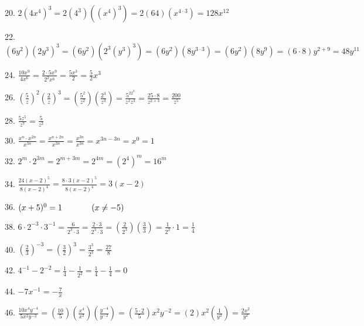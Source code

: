 \documentclass[letterpaper]{article}
\begin{document}
20. $2(4x^4)^3=2(4^3)((x^4)^3)=2(64)(x^{4\cdot3})=128x^{12}$

\bigskip

22. $(6y^2)(2y^3)^3=(6y^2)(2^3(y^3)^3)=(6y^2)(8y^{3\cdot3})=(6y^2)(8y^9)=
    (6\cdot8)y^{2+9}=48y^{11}$

\bigskip

24. $\frac{10x^9}{4x^6}=\frac{2\cdot5x^9}{2^2x^6}=\frac{5x^3}{2}=\frac{5}{2}x^3$

\bigskip

26. $\left(\frac{5}{z}\right)^2\left(\frac{2}{z}\right)^3=
     \left(\frac{5^2}{z^2}\right)\left(\frac{2^3}{z^3}\right)=
     \frac{5^22^3}{z^2z^3}=
     \frac{25\cdot8}{z^{2+3}}=
     \frac{200}{z^5}$

\bigskip

28. $\frac{5z^5}{z^7}=\frac{5}{z^2}$

\bigskip

30. $\frac{x^n\cdot x^{2n}}{x^{3n}}=\frac{x^{n+2n}}{x^{3n}}=\frac{x^{3n}}{x^{3n}}=
     x^{3n-3n}=x^0=1$

\bigskip

32. $2^m\cdot2^{3m}=2^{m+3m}=2^{4m}=(2^4)^m=16^m$

\bigskip

34. $\frac{24(x-2)^5}{8(x-2)^4}=\frac{8\cdot3(x-2)^5}{8(x-2)^4}=3(x-2)$

\bigskip

36. $(x+5)^0=1\hspace{0.5in}(x\ne-5)$

\bigskip

38. $6\cdot2^{-3}\cdot3^{-1}=\frac{6}{2^3\cdot3}=\frac{2\cdot3}{2^3\cdot3}=
     \left(\frac{2}{2^3}\right)\left(\frac{3}{3}\right)=\frac{1}{2^2}\cdot1=
     \frac{1}{4}$

\bigskip

40. $\left(\frac{2}{3}\right)^{-3}=\left(\frac{3}{2}\right)^3=\frac{3^3}{2^3}=
     \frac{27}{8}$

\bigskip

42. $4^{-1}-2^{-2}=\frac{1}{4}-\frac{1}{2^2}=\frac{1}{4}-\frac{1}{4}= 0$

\bigskip

44. $-7x^{-1}=-\frac{7}{x}$

\bigskip

46. $\frac{10x^4y^{-4}}{5x^2y^{-2}}=
     \left(\frac{10}{5}\right)\left(\frac{x^4}{x^2}\right)
         \left(\frac{y^{-4}}{y^{-2}}\right)=
     \left(\frac{5\cdot2}{5}\right)x^2y^{-2}=
     \left(2\right)x^2\left(\frac{1}{y^2}\right)=
     \frac{2x^2}{y^2}$
\end{document}
